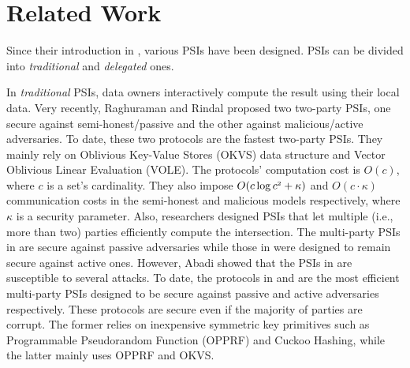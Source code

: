 

\vspace{-2.5mm}
\section{Related Work}\label{sec::related-work}


Since their introduction in \cite{DBLP:conf/eurocrypt/FreedmanNP04}, various PSIs have been designed. PSIs can be divided into \textit{traditional} and \textit{delegated} ones.  


In \textit{traditional} PSIs, data owners interactively compute the result using their local data. 
%
Very recently, Raghuraman and Rindal \cite{RaghuramanR22} proposed two two-party PSIs, one secure against semi-honest/passive and the other against malicious/active adversaries. To date, these two protocols are the fastest two-party PSIs. They mainly rely on  Oblivious Key-Value Stores (OKVS) data structure and Vector Oblivious Linear Evaluation (VOLE). The protocols' computation cost is $O(c)$, where $c$ is  a set's cardinality.  They also impose $O(c\log c^{\scriptscriptstyle 2}+\kappa)$ and $O(c\cdot \kappa)$ communication costs in the semi-honest and malicious models respectively, 
where 
$\kappa$ is a security parameter.  
%
Also, researchers designed PSIs that  let multiple (i.e., more than two) parties efficiently compute the intersection. The multi-party PSIs in  \cite{DBLP:conf/scn/InbarOP18,DBLP:conf/ccs/KolesnikovMPRT17} are secure against  passive adversaries while those in \cite{Ben-EfraimNOP21,GhoshN19,ZhangLLJL19,DBLP:conf/ccs/KolesnikovMPRT17,NevoTY21} were designed to remain secure against  active ones. However, Abadi \et  \cite{AbadiMZ21} showed that the PSIs in  \cite{GhoshN19} are susceptible to several attacks.  To date, the  protocols  in   \cite{DBLP:conf/ccs/KolesnikovMPRT17} and  \cite{NevoTY21} are the most  efficient multi-party PSIs  designed to be  secure against passive and active  adversaries respectively. These protocols are secure even if  the majority of parties are corrupt.  
%
%
The former relies on inexpensive symmetric key primitives such as  Programmable Pseudorandom Function (OPPRF) and Cuckoo Hashing, while the latter mainly uses OPPRF and OKVS. 

